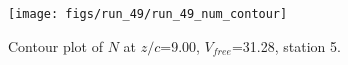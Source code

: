 \begin{figure}[H]
\centering
\texttt{[image: figs/run\_49/run\_49\_num\_contour]}
\caption{Contour plot of $N$ at $z/c$=9.00, $V_{free}$=31.28, station 5.}
\end{figure}


